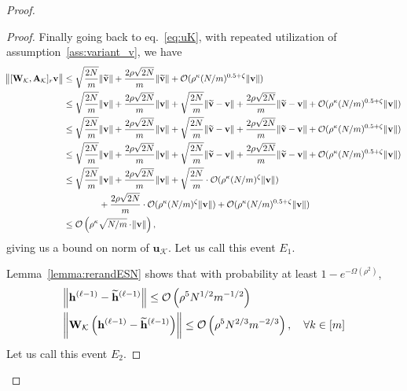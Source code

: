 \begin{proof}
\begin{proof}
		Finally going back to eq.~\ref{eq:uK}, with repeated utilization of assumption~\ref{ass:variant_v}, we have
		\begingroup\allowdisplaybreaks
		\begin{align*}
			\norm{[\mathbf{W}_{\mathcal{K}}, \mathbf{A}_{\mathcal{K}}]_r \mathbf{v}} &\le \sqrt{\frac{2N}{m}} \norm{\widetilde{\mathbf{v}}} + \frac{2\rho \sqrt{2N}}{m} \norm{\widetilde{\mathbf{v}}} + \mathcal{O}(\rho^{\kappa} (N/m)^{0.5 + \zeta} \norm{\mathbf{v}}) \\&
			\le \sqrt{\frac{2N}{m}} \norm{\mathbf{v}} + \frac{2\rho \sqrt{2N}}{m} \norm{\mathbf{v}} + \sqrt{\frac{2N}{m}} \norm{\widetilde{\mathbf{v}} - \mathbf{v}} + \frac{2\rho \sqrt{2N}}{m} \norm{\widetilde{\mathbf{v}} - \mathbf{v}} +  \mathcal{O}(\rho^{\kappa} (N/m)^{0.5 + \zeta} \norm{\mathbf{v}}) \\&
			\le \sqrt{\frac{2N}{m}} \norm{\mathbf{v}} + \frac{2\rho \sqrt{2N}}{m} \norm{\mathbf{v}} + \sqrt{\frac{2N}{m}} \norm{\widetilde{\mathbf{v}} - \mathbf{v}} + \frac{2\rho \sqrt{2N}}{m} \norm{\widetilde{\mathbf{v}} - \mathbf{v}} +  \mathcal{O}(\rho^{\kappa} (N/m)^{0.5 + \zeta} \norm{\mathbf{v}}) \\&
			\le \sqrt{\frac{2N}{m}} \norm{\mathbf{v}} + \frac{2\rho \sqrt{2N}}{m} \norm{\mathbf{v}} + \sqrt{\frac{2N}{m}} \norm{\widetilde{\mathbf{v}} - \mathbf{v}} + \frac{2\rho \sqrt{2N}}{m} \norm{\widetilde{\mathbf{v}} - \mathbf{v}} +  \mathcal{O}(\rho^{\kappa} (N/m)^{0.5 + \zeta} \norm{\mathbf{v}})
			\\&
			\le \sqrt{\frac{2N}{m}} \norm{\mathbf{v}} + \frac{2\rho \sqrt{2N}}{m} \norm{\mathbf{v}} + \sqrt{\frac{2N}{m}} \cdot \mathcal{O}(\rho^{\kappa} (N/m)^{\zeta} \norm{\mathbf{v}}) \\& \quad \quad \quad \quad + \frac{2\rho \sqrt{2N}}{m} \cdot \mathcal{O}(\rho^{\kappa} (N/m)^{\zeta} \norm{\mathbf{v}}) +  \mathcal{O}(\rho^ {\kappa} (N/m)^{0.5 + \zeta} \norm{\mathbf{v}}) \\&
			\le \mathcal{O}\left( \rho^{\kappa} \sqrt{N/m} \cdot \norm{\mathbf{v}}\right),
		\end{align*}
		\endgroup
		giving us a bound on norm of $\mathbf{u}_{\mathcal{K}}$. Let us call this event $E_1$.
		
		Lemma~\ref{lemma:rerandESN} shows that with probability at least $1 - e^{-\Omega(\rho^2)}$,
		\begin{align}
			& \norm{\mathbf{h}^{(\ell-1)} - \widetilde{\mathbf{h}}^{(\ell-1)}} \le \mathcal{O}\left(\rho^{5} N^{1/2} m^{-1/2}\right)\\&
			\norm{ \mathbf{W}_{\mathcal{K}} \left(\mathbf{h}^{(\ell-1)} - \widetilde{\mathbf{h}}^{(\ell-1)}\right) } \leq \mathcal{O}\left(\rho^{5} N^{2 / 3} m^{-2 / 3}\right), \quad \forall k \in [m]
		\end{align}
		Let us call this event $E_2$.
		

\end{proof}
\end{proof}
